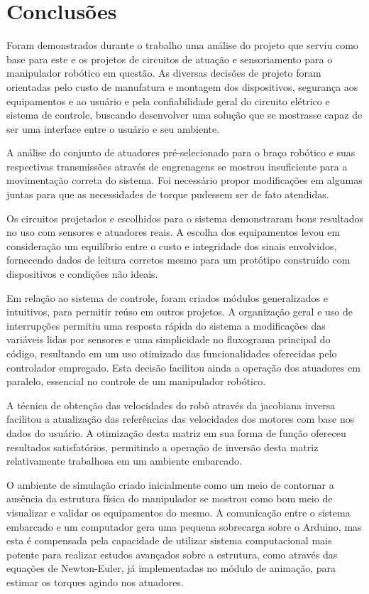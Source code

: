 \chapter{Conclusões}

\label{CapConclusoes}

Foram demonstrados durante o trabalho uma análise do projeto que serviu como base para este e os projetos
de circuitos de atuação e sensoriamento para o manipulador robótico em questão. As diversas decisões de 
projeto foram orientadas pelo custo de manufatura e montagem dos dispositivos, segurança aos equipamentos e ao 
usuário e pela confiabilidade geral do circuito elétrico e sistema de controle, buscando desenvolver uma 
solução que se mostrasse capaz de ser uma interface entre o usuário e seu ambiente.

A análise do conjunto de atuadores pré-selecionado para o braço robótico e suas respectivas transmissões 
através de engrenagens se mostrou insuficiente para a movimentação correta do sistema. Foi necessário 
propor modificações em algumas juntas para que as necessidades de torque pudessem ser de fato atendidas.

Os circuitos projetados e escolhidos para o sistema demonstraram bons resultados no uso com sensores e atuadores reais. 
A escolha dos equipamentos levou em consideração um equilíbrio entre o custo e integridade 
dos sinais envolvidos, fornecendo dados de leitura corretos mesmo para um protótipo construído com dispositivos e 
condições não ideais. 

Em relação ao sistema de controle, foram criados módulos generalizados e intuitivos, para permitir reúso em 
outros projetos. A organização geral e uso de interrupções permitiu uma resposta rápida do sistema a modificações
das variáveis lidas por sensores e uma simplicidade no fluxograma principal do código, resultando em um uso
otimizado das funcionalidades oferecidas pelo controlador empregado. Esta decisão facilitou ainda a operação
dos atuadores em paralelo, essencial no controle de um manipulador robótico.

A técnica de obtenção das velocidades do robô através da jacobiana inversa facilitou a atualização das
referências das velocidades dos motores com base nos dados do usuário. A otimização desta matriz 
em sua forma de função ofereceu resultados satisfatórios, permitindo a operação de inversão desta matriz
relativamente trabalhosa em um ambiente embarcado.

O ambiente de simulação criado inicialmente como um meio de contornar a ausência da estrutura física do
manipulador se mostrou como bom meio de visualizar e validar os equipamentos do mesmo. A comunicação
entre o sistema embarcado e um computador gera uma pequena sobrecarga sobre o Arduino, mas esta é compensada pela capacidade
de utilizar sistema computacional mais potente para realizar estudos avançados sobre a estrutura,
como através das equações de Newton-Euler, já implementadas no módulo de animação, para estimar os torques agindo nos
atuadores.

